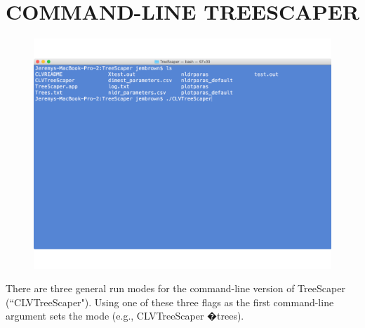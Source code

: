 \documentclass[11pt]{article}
\begin{document}
\newpage
\section{COMMAND-LINE TREESCAPER}\label{sect:CLV}

\begin{figure}[thbp!]\centering
\includegraphics[scale=0.4]{imagesForManual/CLVTreeScaper.pdf}
\end{figure}

There are three general run modes for the command-line version of TreeScaper
(``CLVTreeScaper"). Using one of these three flags as the first command-line argument sets
the mode (e.g., CLVTreeScaper �trees).
\end{document}
